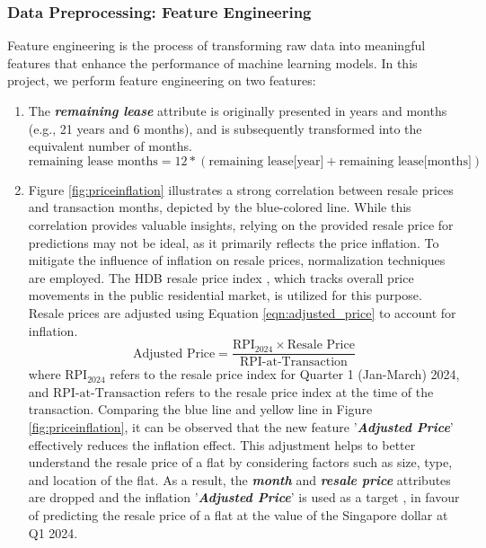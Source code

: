 \subsubsection{Data Preprocessing: Feature Engineering}
Feature engineering is the process of transforming raw data into meaningful features that enhance the performance of machine learning models. In this project, we perform feature engineering on two features: 
\begin{enumerate}
    \item The \textit{\textbf{remaining lease}} attribute is originally presented in years and months (e.g., 21 years and 6 months), and is subsequently transformed into the equivalent number of months.
        \begin{equation}\label{eqn:remain_lease}
           \text{remaining lease months} = 12*(\text{remaining lease[year]} + \text{remaining lease[months]})
        \end{equation} 
    \item Figure \ref{fig:priceinflation} illustrates a strong correlation between resale prices and transaction months, depicted by the blue-colored line. While this correlation provides valuable insights, relying on the provided resale price for predictions may not be ideal, as it primarily reflects the price inflation. To mitigate the influence of inflation on resale prices, normalization techniques are employed. The HDB resale price index \cite{web:HDBdata}, which tracks overall price movements in the public residential market, is utilized for this purpose. Resale prices are adjusted using Equation \ref{eqn:adjusted_price} to account for inflation.
        \begin{equation}\label{eqn:adjusted_price}
           \text{Adjusted Price} = \frac{\text{RPI}_{2024} \times \text{Resale Price}}{\text{RPI-at-Transaction}}
        \end{equation} where $\text{RPI}_{2024}$ refers to the resale price index for Quarter 1 (Jan-March) 2024, and $\text{RPI-at-Transaction}$ refers to the resale price index at the time of the transaction. Comparing the blue line and yellow line in Figure \ref{fig:priceinflation}, it can be observed that the new feature '\textit{\textbf{Adjusted Price}}' effectively reduces the inflation effect. This adjustment helps to better understand the resale price of a flat by considering factors such as size, type, and location of the flat. As a result, the \textit{\textbf{month}} and \textit{\textbf{resale price}}  attributes are dropped and the inflation '\textit{\textbf{Adjusted Price}}' is used as a target , in favour of predicting the resale price of a flat at the value of the Singapore dollar at Q1 2024.    
\end{enumerate}

